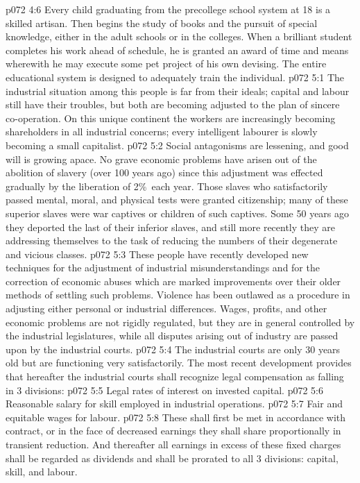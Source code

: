 \vs p072 4:6 Every child graduating from the precollege school system at 18 is a skilled artisan. Then begins the study of books and the pursuit of special knowledge, either in the adult schools or in the colleges. When a brilliant student completes his work ahead of schedule, he is granted an award of time and means wherewith he may execute some pet project of his own devising. The entire educational system is designed to adequately train the individual.
\vs p072 5:1 The industrial situation among this people is far from their ideals; capital and labour still have their troubles, but both are becoming adjusted to the plan of sincere co\hyp{}operation. On this unique continent the workers are increasingly becoming shareholders in all industrial concerns; every intelligent labourer is slowly becoming a small capitalist.
\vs p072 5:2 Social antagonisms are lessening, and good will is growing apace. No grave economic problems have arisen out of the abolition of slavery (over 100 years ago) since this adjustment was effected gradually by the liberation of 2\%\ each year. Those slaves who satisfactorily passed mental, moral, and physical tests were granted citizenship; many of these superior slaves were war captives or children of such captives. Some 50 years ago they deported the last of their inferior slaves, and still more recently they are addressing themselves to the task of reducing the numbers of their degenerate and vicious classes.
\vs p072 5:3 \pc These people have recently developed new techniques for the adjustment of industrial misunderstandings and for the correction of economic abuses which are marked improvements over their older methods of settling such problems. Violence has been outlawed as a procedure in adjusting either personal or industrial differences. Wages, profits, and other economic problems are not rigidly regulated, but they are in general controlled by the industrial legislatures, while all disputes arising out of industry are passed upon by the industrial courts.
\vs p072 5:4 The industrial courts are only 30 years old but are functioning very satisfactorily. The most recent development provides that hereafter the industrial courts shall recognize legal compensation as falling in 3 divisions:
\vs p072 5:5 \bibnobreakspace Legal rates of interest on invested capital.
\vs p072 5:6 \bibnobreakspace Reasonable salary for skill employed in industrial operations.
\vs p072 5:7 \bibnobreakspace Fair and equitable wages for labour.
\vs p072 5:8 \pc These shall first be met in accordance with contract, or in the face of decreased earnings they shall share proportionally in transient reduction. And thereafter all earnings in excess of these fixed charges shall be regarded as dividends and shall be prorated to all 3 divisions: capital, skill, and labour.

